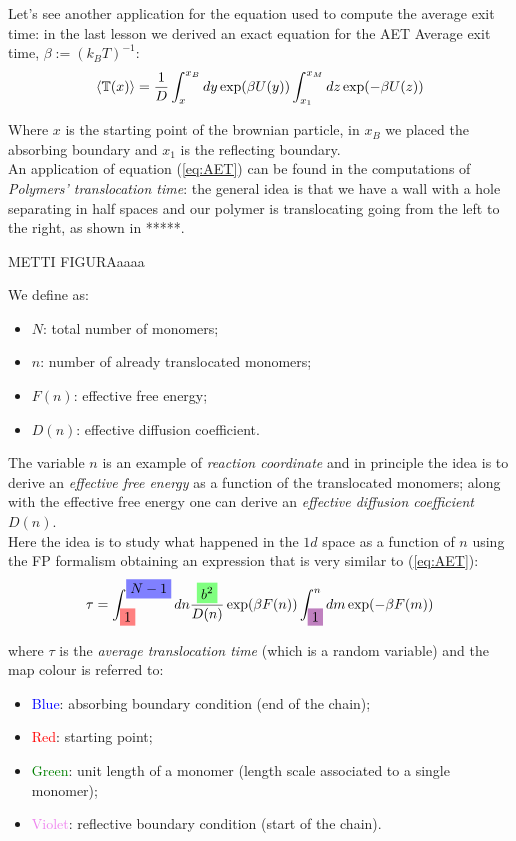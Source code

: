 \documentclass[\main/main.tex]{subfiles}
\begin{document}
Let's see another application for the equation used to compute the average exit time: in the last lesson we derived an exact equation for the AET
Average exit time, $\beta:=(k_B T)^{-1}$:
\begin{align}
     \left\langle \mathbb{T}(x) \right\rangle= \frac{1}{D}\int_x^{x_B}dy\exp(\beta U(y))\int_{x_{1}} ^{x_M} dz \exp(-{\beta U(z)})
\label{eq:AET}
\end{align}

Where $x$ is the starting point of the brownian particle, in $x_B$ we placed the absorbing boundary and $x_1$ is the  reflecting boundary. \\
An application of equation (\ref{eq:AET}) can be found in the computations of \textit{Polymers' translocation time}: the general idea is that we have a wall with a hole separating in half spaces and our polymer is translocating going from the left to the right, as shown in *****.
\begin{center}
    METTI FIGURAaaaa
\end{center}
We define as:
\begin{itemize}
    \item $N$: total number of monomers;
    \item $n$: number of already translocated monomers;
    \item $F(n)$: effective free energy;
    \item $D(n)$: effective diffusion coefficient.
\end{itemize}
The variable $n$ is an example of \textit{reaction coordinate} and in principle the idea is to derive an \textit{effective free energy} as a function of the translocated monomers; along with the effective free energy one can derive an \textit{effective diffusion coefficient} $D(n)$. \\

Here the idea is to study what happened in the $1d$ space
as a function of $n$ using the FP formalism obtaining an expression that is very similar to (\ref{eq:AET}):
\begin{eqnarray}
    \tau=\int_{\hlc{red}{1}} ^{\hlc{blue}{N-1}} dn \frac{\hlc{green}{b^2}}{D(n)}\exp(\beta F(n))\int_{\hlc{violet} {1}}^{n} dm\exp(-\beta F(m))
\end{eqnarray}

where $\tau$ is the \textit{average translocation time} (which is a random variable) and the map colour is referred to:
\begin{itemize}
    \item \textcolor{blue}{Blue}: absorbing boundary condition (end of the chain);
    \item {\textcolor{red}{Red}}: starting point;
    \item  \textcolor{green}{Green}: unit length of a monomer (length scale associated to a single monomer);
    \item \textcolor{violet}{Violet}: reflective boundary condition (start of the chain).
\end{itemize}
\end{document}
